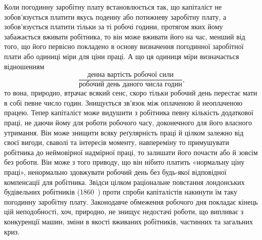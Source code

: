 Коли погодинну заробітну плату встановлюється так, що
капіталіст не зобов’язується платити якусь поденну або потижневу
заробітну плату, а зобов’язується платити тільки за ті
робочі години, протягом яких йому забажається вживати робітника,
то він може вживати його на час, менший від того, що його
первісно покладено в основу визначення погодинної заробітної
плати або одиниці міри для ціни праці. А що ця одиниця міри
визначається відношенням\[
\frac{\text{денна вартість робочої сили}}{\text{робочий день даного числа годин}}
\text{,}
\]
\noindent{}то вона, природно, втрачає всякий сенс, скоро тільки робочий
день перестає мати в собі певне число годин. Знищується зв’язок
між оплаченою й неоплаченою працею. Тепер капіталіст може
видушити з робітника певну кількість додаткової праці, не даючи
йому для роботи робочого часу, доконечного для його власного
утримання. Він може знищити всяку реґулярність праці й цілком
залежно від своєї вигоди, сваволі та інтересів моменту, навпереміну
то примушувати робітника до неймовірної надмірної
праці, то залишати його почасти або й зовсім без роботи. Він
може з того приводу, що він нібито платить «нормальну ціну
праці», ненормально здовжувати робочий день без будь-якої відповідної
компенсації для робітника. Звідси цілком раціональне
повстання лондонських будівельних робітників (1860~) проти
спроби капіталістів накинути їм таку погодинну заробітну плату.
Законодавче обмеження робочого дня покладає кінець цій неподобності,
хоч, природно, не знищує недостачі роботи, що випливає
з конкуренції машин, зміни в якості вживаних робітників,
частинних та загальних криз.

